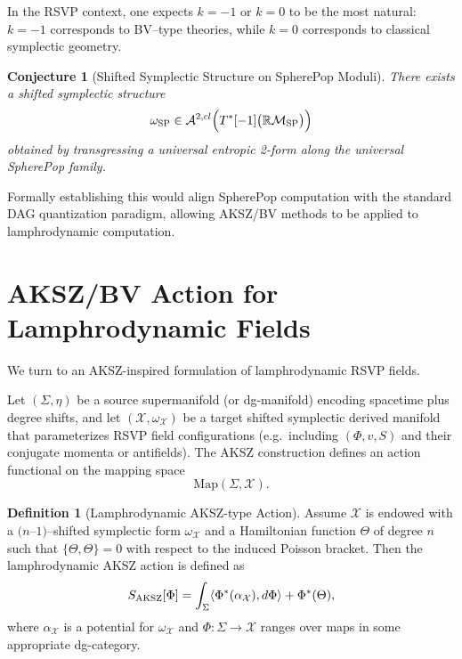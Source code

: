 \documentclass[12pt]{article}
\theoremstyle{plain}
\newtheorem{conjecture_env}[theorem]{Conjecture}
\theoremstyle{definition}
\newtheorem{definition}[theorem]{Definition}
\theoremstyle{remark}
\begin{document}
In the RSVP context, one expects $k=-1$ or $k=0$ to be the most natural:
$k=-1$ corresponds to BV--type theories, while $k=0$ corresponds to classical
symplectic geometry.

\begin{conjecture_env}[Shifted Symplectic Structure on SpherePop Moduli]
There exists a shifted symplectic structure
\[
    \omega_{\rm SP} \in \mathcal{A}^{2,cl}
    \Bigl( T^\ast[-1]\big( \mathbb{R}\mathcal{M}_{\rm SP} \big) \Bigr)
\]
obtained by transgressing a universal entropic 2-form along the universal
SpherePop family.
\end{conjecture_env}

Formally establishing this would align SpherePop computation with the standard
DAG quantization paradigm, allowing AKSZ/BV methods to be applied to
lamphrodynamic computation.


\section{AKSZ/BV Action for Lamphrodynamic Fields}

We turn to an AKSZ-inspired formulation of lamphrodynamic RSVP fields.

Let $(\Sigma,\eta)$ be a source supermanifold (or dg-manifold) encoding
spacetime plus degree shifts, and let $(\mathcal{X},\omega_{\mathcal{X}})$ be a
target shifted symplectic derived manifold that parameterizes RSVP field
configurations (e.g.\ including $(\Phi,v,S)$ and their conjugate momenta or
antifields). The AKSZ construction defines an action functional on the mapping
space
\[
    \mathrm{Map}(\Sigma,\mathcal{X}).
\]

\begin{definition}[Lamphrodynamic AKSZ-type Action]
Assume $\mathcal{X}$ is endowed with a $(n$--$1)$--shifted symplectic form
$\omega_{\mathcal{X}}$ and a Hamiltonian function $\Theta$ of degree $n$ such
that $\{\Theta,\Theta\}=0$ with respect to the induced Poisson bracket. Then
the lamphrodynamic AKSZ action is defined as
\[
    S_{\rm AKSZ}[\Phi]
    = \int_{\Sigma}
        \langle \Phi^\ast(\alpha_{\mathcal{X}}),
                d \Phi \rangle
        + \Phi^\ast(\Theta),
\]
where $\alpha_{\mathcal{X}}$ is a potential for $\omega_{\mathcal{X}}$ and
$\Phi:\Sigma\to\mathcal{X}$ ranges over maps in some appropriate dg-category.
\end{definition}
\end{document}
